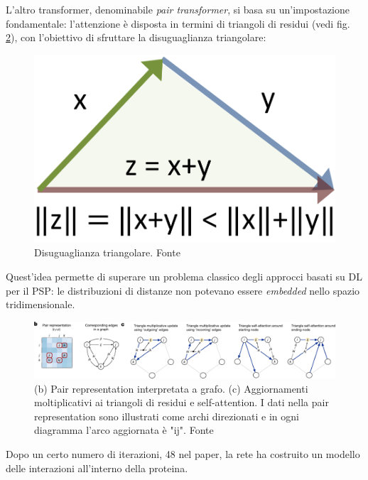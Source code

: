 L'altro transformer, denominabile \textit{pair transformer}, si basa su un'impostazione fondamentale: l'attenzione è disposta in termini di triangoli di residui (vedi fig. \ref{fig:triangoli-residui}), con l'obiettivo di sfruttare la disuguaglianza triangolare:

\begin{figure}[!htb]
	\centering
	\includegraphics[scale=0.15]{images/disuguaglianza triangolare.PNG}
	\caption{Disuguaglianza triangolare. Fonte\cite{disTriang}}
	\label{fig:}
\end{figure}

Quest'idea permette di superare un problema classico degli approcci basati su DL per il PSP: le distribuzioni di distanze non potevano essere \textit{embedded} nello spazio tridimensionale. 

\begin{figure}[!htb]
	\centering
	\includegraphics[scale=0.42]{images/triangoli.png}
	\caption{(b) Pair representation interpretata a grafo. (c) Aggiornamenti moltiplicativi ai triangoli di residui e self-attention. I dati nella pair representation sono illustrati come archi direzionati e in ogni diagramma l'arco aggiornata è "ij". Fonte\cite{jumper2021highly}}
	\label{fig:triangoli-residui}
\end{figure}

Dopo un certo numero di iterazioni, 48 nel paper, la rete ha costruito un modello delle interazioni all'interno della proteina. 


